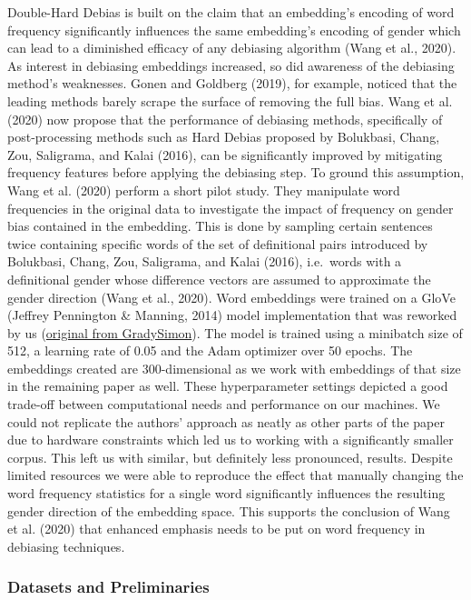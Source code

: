 \documentclass[
  english,
  man,floatsintext]{apa6}
\begin{document}
Double-Hard Debias is built on the claim that an embedding's encoding of word frequency significantly influences the same embedding's encoding of gender which can lead to a diminished efficacy of any debiasing algorithm (Wang et al., 2020). As interest in debiasing embeddings increased, so did awareness of the debiasing method's weaknesses. Gonen and Goldberg (2019), for example, noticed that the leading methods barely scrape the surface of removing the full bias. Wang et al. (2020) now propose that the performance of debiasing methods, specifically of post-processing methods such as Hard Debias proposed by Bolukbasi, Chang, Zou, Saligrama, and Kalai (2016), can be significantly improved by mitigating frequency features before applying the debiasing step.
To ground this assumption, Wang et al. (2020) perform a short pilot study. They manipulate word frequencies in the original data to investigate the impact of frequency on gender bias contained in the embedding. This is done by sampling certain sentences twice containing specific words of the set of definitional pairs introduced by Bolukbasi, Chang, Zou, Saligrama, and Kalai (2016), i.e.~words with a definitional gender whose difference vectors are assumed to approximate the gender direction (Wang et al., 2020).
Word embeddings were trained on a GloVe (Jeffrey Pennington \& Manning, 2014) model implementation that was reworked by us (\href{https://github.com/GradySimon/tensorflow-glove}{original from GradySimon}). The model is trained using a minibatch size of 512, a learning rate of 0.05 and the Adam optimizer over 50 epochs. The embeddings created are 300-dimensional as we work with embeddings of that size in the remaining paper as well. These hyperparameter settings depicted a good trade-off between computational needs and performance on our machines.
We could not replicate the authors' approach as neatly as other parts of the paper due to hardware constraints which led us to working with a significantly smaller corpus. This left us with similar, but definitely less pronounced, results. Despite limited resources we were able to reproduce the effect that manually changing the word frequency statistics for a single word significantly influences the resulting gender direction of the embedding space. This supports the conclusion of Wang et al. (2020) that enhanced emphasis needs to be put on word frequency in debiasing techniques.

\hypertarget{datasets-and-preliminaries}{%
\subsubsection{Datasets and Preliminaries}\label{datasets-and-preliminaries}}
\end{document}
